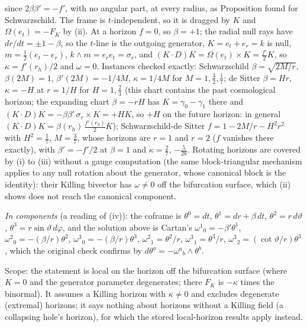 since $2\beta\beta' = -f'$, with no angular part, at every radius, as Proposition  found for Schwarzschild. The frame is $t$-independent, so it is dragged by $K$ and $\Omega(e_{t}) = -F_{K}$ by (ii). At a horizon $f = 0$, so $\beta = +1$; the radial null rays have $dr/dt = \pm1 - \beta$, so the $t$-line is the outgoing generator, $K = e_{t} + e_{r} = k$ is null, $m = \tfrac12(e_{t} - e_{r})$, $k\wedge m = e_{r}e_{t} = \sigma_{r}$, and $(K\cdot D)K = \Omega(e_{t})\times K = \tfrac{f'}{2}K$, so $\kappa = f'(r_{h})/2$ and $\omega = 0$. Instances checked exactly: Schwarzschild $\beta = \sqrt{2M/r}$, $\beta(2M) = 1$, $\beta'(2M) = -1/4M$, $\kappa = 1/4M$ for $M = 1, \tfrac32, \tfrac17$; de Sitter $\beta = Hr$, $\kappa = -H$ at $r = 1/H$ for $H = 1, \tfrac23$ (this chart contains the past cosmological horizon; the expanding chart $\beta = -rH$ has $K = \gamma_{0} - \gamma_{1}$ there and $(K\cdot D)K = -\beta\beta'\,\sigma_{r}\times K = +HK$, so $+H$ on the future horizon: in general $(K\cdot D)K = \beta(r_{h})\,\tfrac{f'(r_{h})}{2}K$); Schwarzschild-de Sitter $f = 1 - 2M/r - H^{2}r^{2}$ with $H^{2} = \tfrac17$, $M = \tfrac37$, whose horizons are $r = 1$ and $r = 2$ ($f$ vanishes there exactly), with $\beta' = -f'/2$ at $\beta = 1$ and $\kappa = \tfrac27$, $-\tfrac{5}{28}$. Rotating horizons are covered by (i) to (iii) without a gauge computation (the same block-triangular mechanism applies to any null rotation about the generator, whose canonical block is the identity): their Killing bivector has $\omega \ne 0$ off the bifurcation surface, which (ii) shows does not reach the canonical component.

\emph{In components} (a reading of (iv)): the coframe is $\theta^{0} = dt$, $\theta^{1} = dr + \beta\,dt$, $\theta^{2} = r\,d\vartheta$, $\theta^{3} = r\sin\vartheta\,d\varphi$, and the solution above is Cartan's $\omega^{1}{}_{0} = -\beta'\theta^{1}$, $\omega^{2}{}_{0} = -(\beta/r)\theta^{2}$, $\omega^{3}{}_{0} = -(\beta/r)\theta^{3}$, $\omega^{2}{}_{1} = \theta^{2}/r$, $\omega^{3}{}_{1} = \theta^{3}/r$, $\omega^{3}{}_{2} = (\cot\vartheta/r)\theta^{3}$, which the original check confirms by $d\theta^{a} = -\omega^{a}{}_{b}\wedge\theta^{b}$.

Scope: the statement is local on the horizon off the bifurcation surface (where $K = 0$ and the generator parameter degenerates; there $F_{K}$ is $-\kappa$ times the binormal). It assumes a Killing horizon with $\kappa \ne 0$ and excludes degenerate (extremal) horizons; it says nothing about horizons without a Killing field (a collapsing hole's horizon), for which the stored local-horizon results apply instead.
